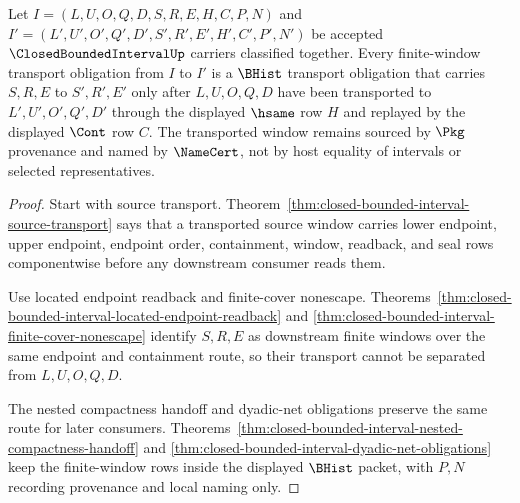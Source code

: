 \begin{theorem}
\label{thm:closed-bounded-interval-finite-window-transport-obligations}
Let $I=(L,U,O,Q,D,S,R,E,H,C,P,N)$ and $I'=(L',U',O',Q',D',S',R',E',H',C',P',N')$ be accepted $\ClosedBoundedIntervalUp$ carriers classified together. Every finite-window transport obligation from $I$ to $I'$ is a $\BHist$ transport obligation that carries $S,R,E$ to $S',R',E'$ only after $L,U,O,Q,D$ have been transported to $L',U',O',Q',D'$ through the displayed $\hsame$ row $H$ and replayed by the displayed $\Cont$ row $C$. The transported window remains sourced by $\Pkg$ provenance and named by $\NameCert$, not by host equality of intervals or selected representatives.
\end{theorem}
\begin{proof}
Start with source transport. Theorem~\ref{thm:closed-bounded-interval-source-transport} says that a transported source window carries lower endpoint, upper endpoint, endpoint order, containment, window, readback, and seal rows componentwise before any downstream consumer reads them.

Use located endpoint readback and finite-cover nonescape. Theorems~\ref{thm:closed-bounded-interval-located-endpoint-readback} and \ref{thm:closed-bounded-interval-finite-cover-nonescape} identify $S,R,E$ as downstream finite windows over the same endpoint and containment route, so their transport cannot be separated from $L,U,O,Q,D$.

The nested compactness handoff and dyadic-net obligations preserve the same route for later consumers. Theorems~\ref{thm:closed-bounded-interval-nested-compactness-handoff} and \ref{thm:closed-bounded-interval-dyadic-net-obligations} keep the finite-window rows inside the displayed $\BHist$ packet, with $P,N$ recording provenance and local naming only.
\end{proof}

